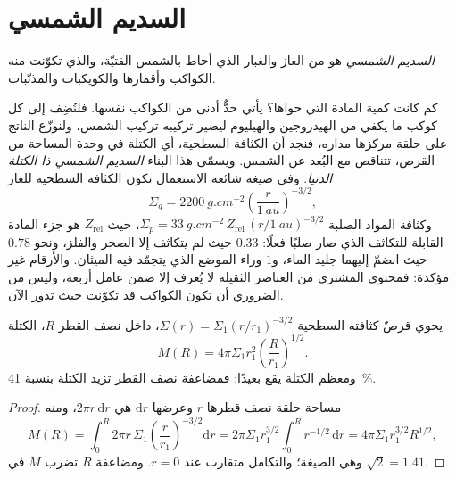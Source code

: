 \section{السديم الشمسي}

\begin{definition}\label{def:b2:planet-formation-meteorites:nebula}
\emph{السديم الشمسي} هو  من الغاز
والغبار الذي أحاط بالشمس الفتيّة، والذي تكوّنت منه الكواكب وأقمارها
والكويكبات والمذنّبات.
\end{definition}

كم كانت كمية المادة التي حواها؟ يأتي حدٌّ أدنى من الكواكب نفسها.
فلنُضِف إلى كل كوكب ما يكفي من الهيدروجين والهيليوم ليصير تركيبه تركيب
الشمس، ولنوزّع الناتج على حلقة مركزها مداره، فنجد أن الكثافة السطحية،
أي الكتلة في وحدة المساحة من القرص، تتناقص مع البُعد عن
الشمس. ويسمّى هذا البناء \emph{السديم الشمسي ذا الكتلة
الدنيا}. وفي صيغة شائعة الاستعمال تكون الكثافة
السطحية للغاز
\[
  \Sigma_g = \qty{2200}{g.cm^{-2}}\left(\frac{r}{\qty{1}{au}}\right)^{-3/2},
\]
وكثافة المواد الصلبة $\Sigma_p = \qty{33}{g.cm^{-2}}\,Z_{\mathrm{rel}}\,
(r/\qty{1}{au})^{-3/2}$، حيث $Z_{\mathrm{rel}}$ هو جزء المادة القابلة للتكاثف
الذي صار صلبًا فعلًا: $0.33$ حيث لم يتكاثف إلا الصخر
والفلز، ونحو $0.78$ حيث انضمّ إليهما جليد الماء، و$1$ وراء الموضع
الذي يتجمّد فيه الميثان. والأرقام غير مؤكدة: فمحتوى المشتري من العناصر الثقيلة
لا يُعرف إلا ضمن عامل أربعة، وليس من الضروري أن تكون الكواكب قد
تكوّنت حيث تدور الآن.

\begin{proposition}\label{prop:b2:planet-formation-meteorites:disc-mass}
يحوي قرصٌ كثافته السطحية $\Sigma(r) = \Sigma_1 (r/r_1)^{-3/2}$، داخل
نصف القطر $R$، الكتلة
\[
  M(R) = 4\pi\Sigma_1 r_1^2 \left(\frac{R}{r_1}\right)^{1/2}.
\]
ومعظم الكتلة يقع بعيدًا: فمضاعفة نصف القطر تزيد الكتلة بنسبة \qty{41}{\percent}.
\end{proposition}

\begin{proof}
مساحة حلقة نصف قطرها $r$ وعرضها $\mathrm dr$ هي $2\pi r\,\mathrm dr$، ومنه
\[
  M(R) = \int_0^R 2\pi r\,\Sigma_1 \left(\frac{r}{r_1}\right)^{-3/2}\mathrm dr
       = 2\pi\Sigma_1 r_1^{3/2}\int_0^R r^{-1/2}\,\mathrm dr
       = 4\pi\Sigma_1 r_1^{3/2} R^{1/2},
\]
وهي الصيغة؛ والتكامل متقارب عند $r = 0$. ومضاعفة $R$
تضرب $M$ في $\sqrt 2 = 1.41$.
\end{proof}

